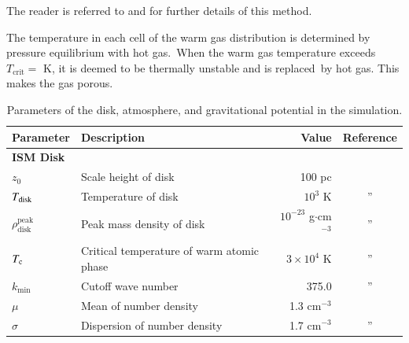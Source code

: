 \documentclass[twocolumn]{aastex631}
\begin{document}
  The reader is referred to \citet{LA2002} and \citet{Wagner2012} for further details of this method.


  The temperature in each cell of the warm gas distribution is determined by pressure equilibrium with hot gas.\
  When the warm gas temperature exceeds $T_{\text{crit}}=$ K, it is deemed to be thermally unstable and is replaced\
  by hot gas. This makes the gas porous.


\begin{table}[t]
\centering
\caption{Parameters of the disk, atmosphere, and gravitational potential in the simulation.}
\label{table-parameters}
\begin{tabular}{@{}llrc@{}}
\toprule[1pt]\midrule[0.3pt]
Parameter                                             & Description                               & Value                                & Reference                       \\ \midrule
{\bf ISM Disk }                                       &                                           &                                      &                                 \\
$z_{0}$                                               & Scale height of disk                      & 100 pc                               & \citet{peak-ism-density}        \\
$T_{\text{\text{disk}}}$                              & Temperature of disk                       & $10^{3}$ K                           & \multicolumn{1}{c}{''}          \\
$\rho_{\text{disk}}^{\text{peak}}$                    & Peak mass density of disk                 & $10^{-23}$ g$\cdot$cm$^{-3}$         & \multicolumn{1}{c}{''}          \\
$T_{\text{\text{c}}}$                                 & Critical temperature of warm atomic phase & $3\times 10^{4}$ K                   & \multicolumn{1}{c}{''}          \\
$k_{\text{min}}$                                      & Cutoff wave number                        & 375.0                                & \multicolumn{1}{c}{''}          \\
$\mu$                                                 & Mean of number density                    & 1.3 $\text{cm}^{-3}$                 & \citet{Wagner2012}              \\
$\sigma$                                              & Dispersion of number density              & 1.7 $\text{cm}^{-3}$                 & \multicolumn{1}{c}{''}          \\

\end{tabular}
\end{table}
\end{document}
